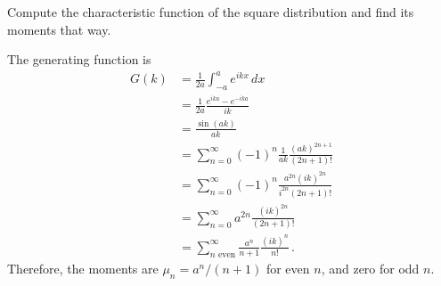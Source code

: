 

Compute the characteristic function of the square distribution and find its moments that way.


The generating function is
\begin{align*}
  G(k)
  &= \frac{1}{2a} \int_{-a}^a e^{ikx} \, dx \\
  &= \frac{1}{2a} \frac{e^{ika} - e^{-ika}}{ik} \\
  &= \frac{\sin(ak)}{ak} \\
  &= \sum_{n=0}^\infty (-1)^n \frac{1}{ak} \frac{(ak)^{2n+1}}{(2n+1)!} \\
  &= \sum_{n=0}^\infty (-1)^n \frac{a^{2n} (ik)^{2n}}{i^{2n}(2n+1)!} \\
  &= \sum_{n=0}^\infty a^{2n} \frac{(ik)^{2n}}{(2n+1)!} \\
  &= \sum_{n \text{ even}}^\infty \frac{a^n}{n+1} \frac{(ik)^n}{n!}
  \, .
\end{align*}
Therefore, the moments are $\mu_n = a^n / (n+1)$ for even $n$, and zero for odd $n$.
